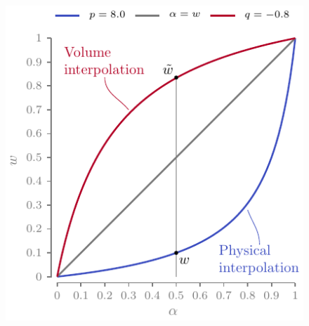 \begin{figure}
    \centering
    \includegraphics{figures/06_DMO/00_ramp/ramp.pdf}
    \caption{}
    \label{fig:06_ramp}
\end{figure}

